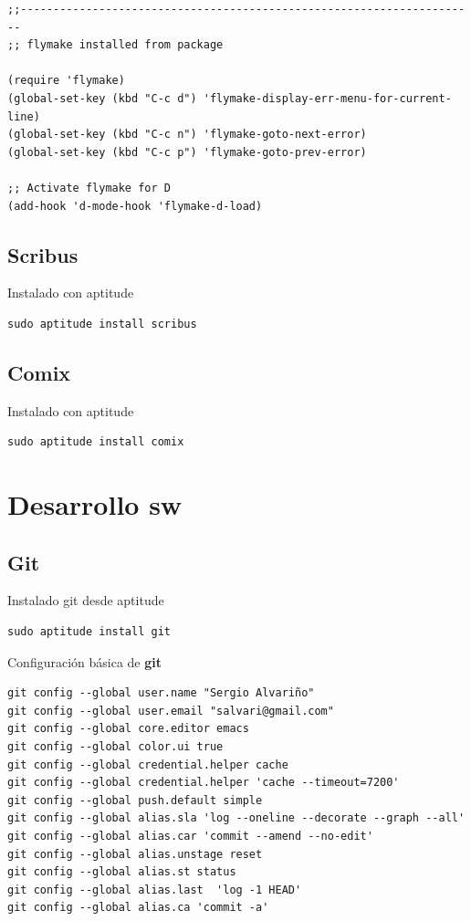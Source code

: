\documentclass[12pt,spanish,]{article}
\begin{document}
\begin{verbatim}
;;----------------------------------------------------------------------
;; flymake installed from package

(require 'flymake)
(global-set-key (kbd "C-c d") 'flymake-display-err-menu-for-current-line)
(global-set-key (kbd "C-c n") 'flymake-goto-next-error)
(global-set-key (kbd "C-c p") 'flymake-goto-prev-error)

;; Activate flymake for D
(add-hook 'd-mode-hook 'flymake-d-load)
\end{verbatim}

\subsection{Scribus}\label{scribus}

Instalado con aptitude

\begin{verbatim}
sudo aptitude install scribus
\end{verbatim}

\subsection{Comix}\label{comix}

Instalado con aptitude

\begin{verbatim}
sudo aptitude install comix
\end{verbatim}

\section{Desarrollo sw}\label{desarrollo-sw}

\subsection{Git}\label{git}

Instalado git desde aptitude

\begin{verbatim}
sudo aptitude install git
\end{verbatim}

Configuración básica de \textbf{git}

\begin{verbatim}
git config --global user.name "Sergio Alvariño"
git config --global user.email "salvari@gmail.com"
git config --global core.editor emacs
git config --global color.ui true
git config --global credential.helper cache
git config --global credential.helper 'cache --timeout=7200'
git config --global push.default simple
git config --global alias.sla 'log --oneline --decorate --graph --all'
git config --global alias.car 'commit --amend --no-edit'
git config --global alias.unstage reset
git config --global alias.st status
git config --global alias.last  'log -1 HEAD'
git config --global alias.ca 'commit -a'
\end{verbatim}
\end{document}

